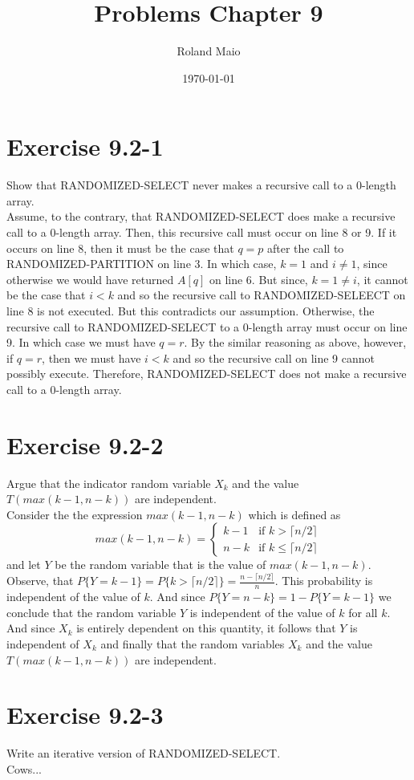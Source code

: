 \documentclass[10pt,a4paper]{article}
\title{Problems Chapter 9}
\author{Roland Maio}
\date{\today}
\begin{document}
\maketitle
\section*{Exercise 9.2-1}
Show that RANDOMIZED-SELECT never makes a recursive call to a 0-length array.
\vspace*{\baselineskip}
\\
Assume, to the contrary, that RANDOMIZED-SELECT does make a recursive call to a 0-length array. Then, this recursive call must occur on line 8 or 9. If it occurs on line 8, then it must be the case that $q=p$ after the call to RANDOMIZED-PARTITION on line 3. In which case, $k=1$ and $i\neq 1$, since otherwise we would have returned $A[q]$ on line 6. But since, $k=1\neq i$, it cannot be the case that $i<k$ and so the recursive call to RANDOMIZED-SELEECT on line 8 is not executed. But this contradicts our assumption. Otherwise, the recursive call to RANDOMIZED-SELECT to a 0-length array must occur on line 9. In which case we must have $q=r$. By the similar reasoning as above, however, if $q=r$, then we must have $i<k$ and so the recursive call on line 9 cannot possibly execute. Therefore, RANDOMIZED-SELECT does not make a recursive call to a 0-length array.

\section*{Exercise 9.2-2}
Argue that the indicator random variable $X_k$ and the value $T(\textit{max}(k-1,n-k))$ are independent.
\vspace*{\baselineskip}
\\
Consider the the expression $\textit{max}(k-1, n-k)$ which is defined as
\begin{equation}
\textit{max}(k-1,n-k)=\begin{cases}
	k-1 & \text{if } k > \lceil n/2\rceil\\
	n-k & \text{if } k \leq \lceil n/2\rceil
	\end{cases}
\end{equation}
and let $Y$ be the random variable that is the value of $\textit{max}(k-1,n-k)$. Observe, that $P\lbrace Y=k-1\rbrace = P\lbrace k > \lceil n/2 \rceil\rbrace = \frac{n-\lceil n/2\rceil}{n}$. This probability is independent of the value of $k$. And since $P\lbrace Y=n-k\rbrace = 1 - P\lbrace Y=k-1\rbrace$ we conclude that the random variable $Y$ is independent of the value of $k$ for all $k$. And since $X_k$ is entirely dependent on this quantity, it follows that $Y$ is independent of $X_k$ and finally that the random variables $X_k$ and the value $T(\textit{max}(k-1,n-k))$ are independent.

\section*{Exercise 9.2-3}
Write an iterative version of RANDOMIZED-SELECT.
\vspace*{\baselineskip}
\\
Cows...
\end{document}
